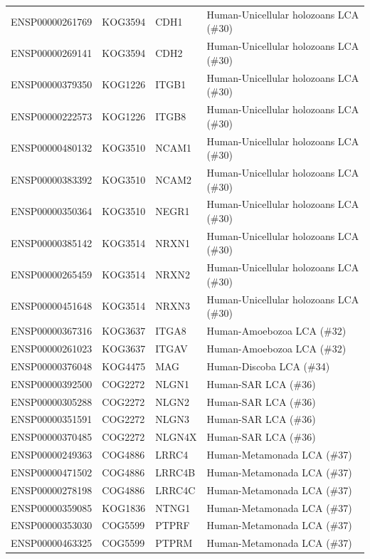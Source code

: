 \begin{table}[H]
\begin{tabular}[t]{llll}
\rowcolor{gray!6}  ENSP00000261769 & KOG3594 & CDH1 & Human-Unicellular holozoans LCA (\#30)\\
ENSP00000269141 & KOG3594 & CDH2 & Human-Unicellular holozoans LCA (\#30)\\
\rowcolor{gray!6}  ENSP00000379350 & KOG1226 & ITGB1 & Human-Unicellular holozoans LCA (\#30)\\
ENSP00000222573 & KOG1226 & ITGB8 & Human-Unicellular holozoans LCA (\#30)\\
\rowcolor{gray!6}  ENSP00000480132 & KOG3510 & NCAM1 & Human-Unicellular holozoans LCA (\#30)\\
ENSP00000383392 & KOG3510 & NCAM2 & Human-Unicellular holozoans LCA (\#30)\\
\rowcolor{gray!6}  ENSP00000350364 & KOG3510 & NEGR1 & Human-Unicellular holozoans LCA (\#30)\\
ENSP00000385142 & KOG3514 & NRXN1 & Human-Unicellular holozoans LCA (\#30)\\
\rowcolor{gray!6}  ENSP00000265459 & KOG3514 & NRXN2 & Human-Unicellular holozoans LCA (\#30)\\
ENSP00000451648 & KOG3514 & NRXN3 & Human-Unicellular holozoans LCA (\#30)\\
\rowcolor{gray!6}  ENSP00000367316 & KOG3637 & ITGA8 & Human-Amoebozoa LCA (\#32)\\
ENSP00000261023 & KOG3637 & ITGAV & Human-Amoebozoa LCA (\#32)\\
\rowcolor{gray!6}  ENSP00000376048 & KOG4475 & MAG & Human-Discoba LCA (\#34)\\
ENSP00000392500 & COG2272 & NLGN1 & Human-SAR LCA (\#36)\\
\rowcolor{gray!6}  ENSP00000305288 & COG2272 & NLGN2 & Human-SAR LCA (\#36)\\
ENSP00000351591 & COG2272 & NLGN3 & Human-SAR LCA (\#36)\\
\rowcolor{gray!6}  ENSP00000370485 & COG2272 & NLGN4X & Human-SAR LCA (\#36)\\
ENSP00000249363 & COG4886 & LRRC4 & Human-Metamonada LCA (\#37)\\
\rowcolor{gray!6}  ENSP00000471502 & COG4886 & LRRC4B & Human-Metamonada LCA (\#37)\\
ENSP00000278198 & COG4886 & LRRC4C & Human-Metamonada LCA (\#37)\\
\rowcolor{gray!6}  ENSP00000359085 & KOG1836 & NTNG1 & Human-Metamonada LCA (\#37)\\
ENSP00000353030 & COG5599 & PTPRF & Human-Metamonada LCA (\#37)\\
\rowcolor{gray!6}  ENSP00000463325 & COG5599 & PTPRM & Human-Metamonada LCA (\#37)\\
\bottomrule
\end{tabular}
\end{table}
